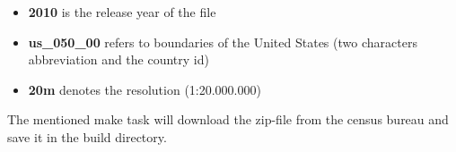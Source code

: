 \begin{itemize}
\item \textbf{2010} is the release year of the file
\item \textbf{us\_050\_00} refers to boundaries of the United States (two characters abbreviation and the country id)
\item \textbf{20m} denotes the resolution (1:20.000.000)
\end{itemize}

The mentioned make task will download the zip-file from the census bureau and save it in the build directory.

